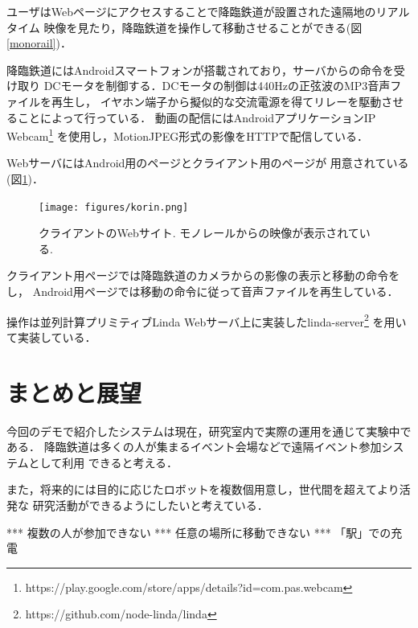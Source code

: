 \documentclass[submit,techreq]{ipsj}
\begin{document}
ユーザはWebページにアクセスすることで降臨鉄道が設置された遠隔地のリアルタイム
映像を見たり，降臨鉄道を操作して移動させることができる(図\ref{monorail})．


降臨鉄道にはAndroidスマートフォンが搭載されており，サーバからの命令を受け取り
DCモータを制御する．DCモータの制御は440Hzの正弦波のMP3音声ファイルを再生し，
イヤホン端子から擬似的な交流電源を得てリレーを駆動させることによって行っている．
動画の配信にはAndroidアプリケーションIP Webcam\footnote{
  \textsf{https://play.google.com/store/apps/details?id=com.pas.webcam}
}
を使用し，MotionJPEG形式の影像をHTTPで配信している．

WebサーバにはAndroid用のページとクライアント用のページが
用意されている(図\ref{browser})．

\begin{figure}[H]
\begin{center}
\texttt{[image: figures/korin.png]}
\end{center}
\caption{クライアントのWebサイト. モノレールからの映像が表示されている.}
\label{browser}
\end{figure}

クライアント用ページでは降臨鉄道のカメラからの影像の表示と移動の命令をし，
Android用ページでは移動の命令に従って音声ファイルを再生している．

操作は並列計算プリミティブLinda\cite{Carriero:1989:LC:63334.63337}
Webサーバ上に実装したlinda-server\footnote{
  \textsf{https://github.com/node-linda/linda}
}
を用いて実装している．

\section{まとめと展望}

今回のデモで紹介したシステムは現在，研究室内で実際の運用を通じて実験中である．
降臨鉄道は多くの人が集まるイベント会場などで遠隔イベント参加システムとして利用
できると考える．

また，将来的には目的に応じたロボットを複数個用意し，世代間を超えてより活発な
研究活動ができるようにしたいと考えている．


*** 複数の人が参加できない *** 任意の場所に移動できない *** 「駅」での充電

{\scriptsize


}
\end{document}
